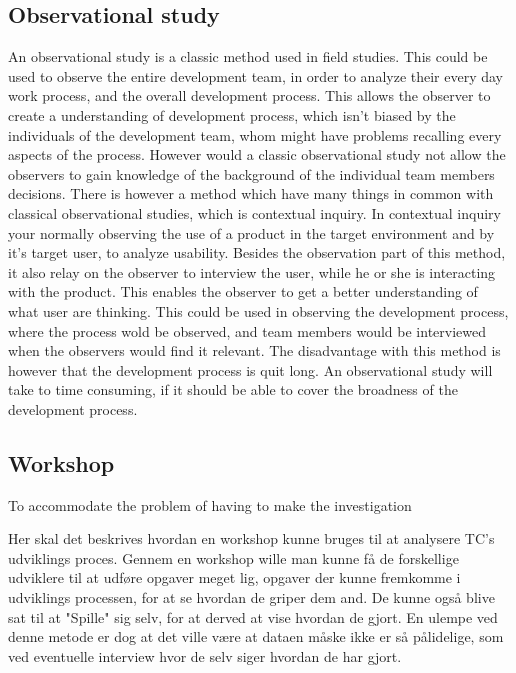 \subsection*{Observational study}
\label{MethodObservation}
An observational study is a classic method used in field studies. This could be used to observe the entire development team, in order to analyze their every day work process, and the overall development process. This allows the observer to create a understanding of development process, which isn't biased by the individuals of the development team, whom might have problems recalling every aspects of the process. However would a classic observational study not allow the observers to gain knowledge of the background of the individual team members decisions. There is however a method which have many things in common with classical observational studies, which is contextual inquiry. In contextual inquiry your normally observing the use of a product in the target environment and by it's target user, to analyze usability. Besides the observation part of this method, it also relay on the observer to interview the user, while he or she is interacting with the product. This enables the observer to get a better understanding of what user are thinking. This could be used in observing the development process, where the process wold be observed, and team members would be interviewed when the observers would find it relevant. The disadvantage with this method is however that the development process is quit long. An observational study will take to time consuming, if it should be able to cover the broadness of the development process.

\subsection*{Workshop}
\label{MethodWorkshop}
To accommodate the problem of having to make the investigation 

Her skal det beskrives hvordan en workshop kunne bruges til at analysere TC's udviklings proces. Gennem en workshop wille man kunne få de forskellige udviklere til at udføre opgaver meget lig, opgaver der kunne fremkomme i udviklings processen, for at se hvordan de griper dem and. De kunne også blive sat til at "Spille" sig selv, for at derved at vise hvordan de gjort. En ulempe ved denne metode er dog at det ville være at dataen måske ikke er så pålidelige, som ved eventuelle interview hvor de selv siger hvordan de har gjort.

